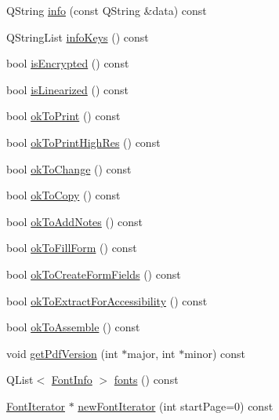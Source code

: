 \begin{DoxyCompactItemize}
\item 
Q\+String \hyperlink{class_poppler_1_1_document_a9ef8eb4458c344ca1533d9af02bc98d5}{info} (const Q\+String \&data) const
\item 
Q\+String\+List \hyperlink{class_poppler_1_1_document_a476e9e81b22ead0bf46e086bda3abe98}{info\+Keys} () const
\item 
bool \hyperlink{class_poppler_1_1_document_aa14566ce82018b575cee3179fbb3f912}{is\+Encrypted} () const
\item 
bool \hyperlink{class_poppler_1_1_document_a0699e1c95414e826dbe2400305d6ba29}{is\+Linearized} () const
\item 
bool \hyperlink{class_poppler_1_1_document_adf941fadec1ccca91f2e209f935c497d}{ok\+To\+Print} () const
\item 
bool \hyperlink{class_poppler_1_1_document_a8fcbb451e7fcd2a72d0dce90a7815de4}{ok\+To\+Print\+High\+Res} () const
\item 
bool \hyperlink{class_poppler_1_1_document_a0d779137e2bd544a1b1cb6251770f544}{ok\+To\+Change} () const
\item 
bool \hyperlink{class_poppler_1_1_document_a22090fb7613d582f4e3327f55bc6e5b4}{ok\+To\+Copy} () const
\item 
bool \hyperlink{class_poppler_1_1_document_a33fa45a3666edcdc9b5deb34861a6670}{ok\+To\+Add\+Notes} () const
\item 
bool \hyperlink{class_poppler_1_1_document_afff0dbfbc5bc11c18784d814db1c4178}{ok\+To\+Fill\+Form} () const
\item 
bool \hyperlink{class_poppler_1_1_document_a19f94305b3a268141f8bf350334cfb33}{ok\+To\+Create\+Form\+Fields} () const
\item 
bool \hyperlink{class_poppler_1_1_document_a9c792ce1274bace5cf18cf77934f993e}{ok\+To\+Extract\+For\+Accessibility} () const
\item 
bool \hyperlink{class_poppler_1_1_document_aabaf987b173987c4ed587ecc70a21edd}{ok\+To\+Assemble} () const
\item 
void \hyperlink{class_poppler_1_1_document_a1edbfdfd0b5adf4be650c2636a309181}{get\+Pdf\+Version} (int $\ast$major, int $\ast$minor) const
\item 
Q\+List$<$ \hyperlink{class_poppler_1_1_font_info}{Font\+Info} $>$ \hyperlink{class_poppler_1_1_document_ad08deee0fbcf175c979c6057f78bded6}{fonts} () const
\item 
\hyperlink{class_poppler_1_1_font_iterator}{Font\+Iterator} $\ast$ \hyperlink{class_poppler_1_1_document_ab7554a98e1cd7b472fe4f1e33565581b}{new\+Font\+Iterator} (int start\+Page=0) const

\end{DoxyCompactItemize}

